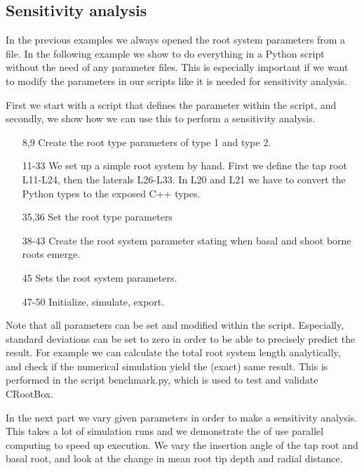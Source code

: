 \documentclass[a4paper]{article}
\begin{document}
\subsection{Sensitivity analysis} \label{sec:sa}

In the previous examples we always opened the root system parameters from a file. 
In the following example we show to do everything in a Python script without the need of any parameter files. 
This is especially important if we want to modify the parameters in our scripts like it is needed for sensitivity analysis. 

First we start with a script that defines the parameter within the script, and secondly, we show how we can use this to perform a sensitivity analysis.



\begin{itemize}

\item[8,9] Create the root type parameters of type 1 and type 2.
\item[11-33] We set up a simple root system by hand. First we define the tap root L11-L24, then the laterals L26-L33. In L20 and L21 we have to convert the Python types to the exposed C++ types.
\item[35,36] Set the root type parameters

\item[38-43] Create the root system parameter stating when basal and shoot borne roots emerge.

\item[45] Sets the root system parameters.

\item[47-50] Initialize, simulate, export. 

\end{itemize}

Note that all parameters can be set and modified within the script. Especially, standard deviations can be set to zero in order to be able to precisely predict the result. 
For example we can calculate the total root system length analytically, and check if the numerical simulation yield the (exact) same result. 
This is performed in the script benchmark.py, which is used to test and validate CRootBox.

In the next part we vary given parameters in order to make a sensitivity analysis. This takes a lot of simulation runs and we demonstrate the of use parallel computing to speed up execution.
We vary the insertion angle of the tap root and basal root, and look at the change in mean root tip depth and radial distance. 
\end{document}
